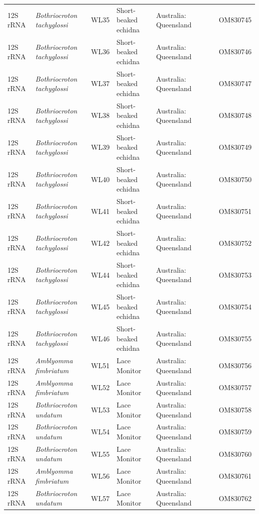 \documentclass[a4paper, nobind]{templates/ociamthesis}
\begin{document}
\begin{landscape}
\begin{longtable}[t]{l>{}lllllll}
12S rRNA & \em{Bothriocroton tachyglossi} & WL35 & Short-beaked echidna & Australia: Queensland &  &  & OM830745\\
12S rRNA & \em{Bothriocroton tachyglossi} & WL36 & Short-beaked echidna & Australia: Queensland &  &  & OM830746\\
12S rRNA & \em{Bothriocroton tachyglossi} & WL37 & Short-beaked echidna & Australia: Queensland &  &  & OM830747\\
12S rRNA & \em{Bothriocroton tachyglossi} & WL38 & Short-beaked echidna & Australia: Queensland &  &  & OM830748\\
12S rRNA & \em{Bothriocroton tachyglossi} & WL39 & Short-beaked echidna & Australia: Queensland &  &  & OM830749\\
12S rRNA & \em{Bothriocroton tachyglossi} & WL40 & Short-beaked echidna & Australia: Queensland &  &  & OM830750\\
12S rRNA & \em{Bothriocroton tachyglossi} & WL41 & Short-beaked echidna & Australia: Queensland &  &  & OM830751\\
12S rRNA & \em{Bothriocroton tachyglossi} & WL42 & Short-beaked echidna & Australia: Queensland &  &  & OM830752\\
12S rRNA & \em{Bothriocroton tachyglossi} & WL44 & Short-beaked echidna & Australia: Queensland &  &  & OM830753\\
12S rRNA & \em{Bothriocroton tachyglossi} & WL45 & Short-beaked echidna & Australia: Queensland &  &  & OM830754\\
12S rRNA & \em{Bothriocroton tachyglossi} & WL46 & Short-beaked echidna & Australia: Queensland &  &  & OM830755\\
12S rRNA & \em{Amblyomma fimbriatum} & WL51 & Lace Monitor & Australia: Queensland &  &  & OM830756\\
12S rRNA & \em{Amblyomma fimbriatum} & WL52 & Lace Monitor & Australia: Queensland &  &  & OM830757\\
12S rRNA & \em{Bothriocroton undatum} & WL53 & Lace Monitor & Australia: Queensland &  &  & OM830758\\
12S rRNA & \em{Bothriocroton undatum} & WL54 & Lace Monitor & Australia: Queensland &  &  & OM830759\\
12S rRNA & \em{Bothriocroton undatum} & WL55 & Lace Monitor & Australia: Queensland &  &  & OM830760\\
12S rRNA & \em{Amblyomma fimbriatum} & WL56 & Lace Monitor & Australia: Queensland &  &  & OM830761\\
12S rRNA & \em{Bothriocroton undatum} & WL57 & Lace Monitor & Australia: Queensland &  &  & OM830762\\

\end{longtable}
\end{landscape}
\end{document}
